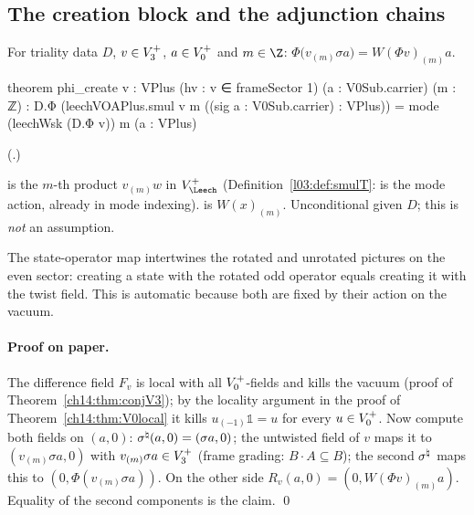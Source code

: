 \subsection{The creation block and the adjunction chains}

\begin{proposition}\label{ch14:prop:create}
For triality data $D$, $v\in V_3^{+}$, $a\in V_0^{+}$ and $m\in\Z$:
$\Phi\bigl(v_{(m)}\sigma a\bigr)=W(\Phi v)_{(m)}a$.
\end{proposition}
\begin{leancode}
theorem phi_create {v : VPlus} (hv : v ∈ frameSector 1) (a : V0Sub.carrier) (m : ℤ) :
    D.Φ (leechVOAPlus.smul v m ((sig a : V0Sub.carrier) : VPlus))
      = mode (leechWsk (D.Φ v)) m (a : VPlus)
\end{leancode}
(.)

\begin{dictionary}
 is the $m$-th product $v_{(m)}w$ in $V_\Leech^+$ (Definition~\ref{l03:def:smulT}:
 is the mode action, already in mode indexing).   is
$W(x)_{(m)}$.  Unconditional given $D$; this is \emph{not} an assumption.
\end{dictionary}
\begin{physics}
The state-operator map intertwines the rotated and unrotated pictures on the even sector: creating a state with the rotated odd operator equals creating it with the twist field. This is automatic because both are fixed by their action on the vacuum.
\end{physics}


\paragraph{Proof on paper.}  The difference field $F_v$ is local with all $V_0^{+}$-fields and
kills the vacuum (proof of Theorem~\ref{ch14:thm:conjV3}); by the locality argument in the proof of
Theorem~\ref{ch14:thm:V0local} it kills $u_{(-1)}\mathbb 1=u$ for every $u\in V_0^{+}$.  Now compute
both fields on $(a,0)$: $\sigma^{\natural}(a,0)=(\sigma a,0)$; the untwisted field of $v$ maps it to
$(v_{(m)}\sigma a,0)$ with $v_{(m)}\sigma a\in V_3^{+}$ (frame grading: $B\cdot A\subseteq B$); the second
$\sigma^{\natural}$ maps this to $(0,\Phi(v_{(m)}\sigma a))$.  On the other side $R_v(a,0)=(0,W(\Phi v)_{(m)}a)$.
Equality of the second components is the claim. \qed

